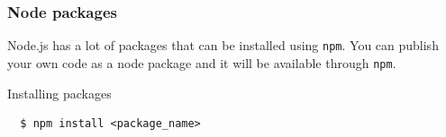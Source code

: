 \begin{frame}[fragile]
  \frametitle{Node packages}

  Node.js has a lot of packages that can be installed using \texttt{npm}. 
  You can publish your own code as a node package and it will be available through \texttt{npm}.

  \pause

  \begin{block}{Installing packages}
  {\scriptsize
  \begin{verbatim}
  $ npm install <package_name>
  \end{verbatim}
  }
  \end{block}
\end{frame}
